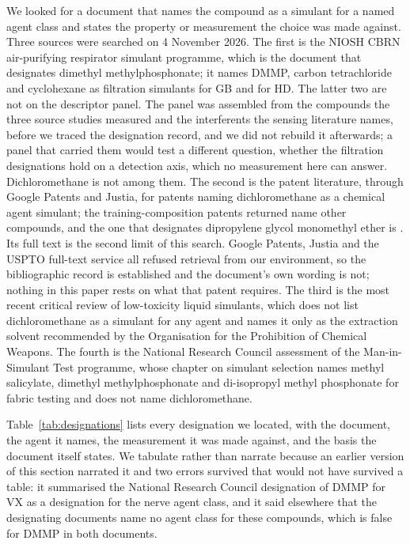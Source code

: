 \documentclass[journal=jacsat,manuscript=suppinfo,margin=1in]{achemso}
\begin{document}
We looked for a document that names the compound as a simulant for a named
agent class and states the property or measurement the choice was made
against. Three sources were searched on 4 November 2026. The first is the
NIOSH CBRN air-purifying respirator simulant programme, which is the
document that designates dimethyl methylphosphonate\cite{niosh2002simulant};
it names DMMP, carbon tetrachloride and cyclohexane as filtration simulants
for GB and for HD. The latter two are not on the descriptor panel. The panel
was assembled from the compounds the three source studies measured and the
interferents the sensing literature names, before we traced the designation
record, and we did not rebuild it afterwards; a panel that carried them would
test a different question, whether the filtration designations hold on a
detection axis, which no measurement here can answer. Dichloromethane is not
among them. The second is the patent literature, through Google Patents and
Justia, for patents naming dichloromethane as a chemical agent simulant;
the training-composition patents returned name other compounds, and the one
that designates dipropylene glycol monomethyl ether is
\cite{seitzinger2006simulant}. Its full text is the second limit of this
search. Google Patents, Justia and the USPTO full-text service all refused
retrieval from our environment, so the bibliographic record is established and
the document's own wording is not; nothing in this paper rests on what that
patent requires. The third is the most recent critical review
of low-toxicity liquid simulants\cite{webb2025}, which does not list
dichloromethane as a simulant for any agent and names it only as the
extraction solvent recommended by the Organisation for the Prohibition of
Chemical Weapons. The fourth is the National Research Council assessment of
the Man-in-Simulant Test programme\cite{nrc1997mist}, whose chapter on
simulant selection names methyl salicylate, dimethyl methylphosphonate and
di-isopropyl methyl phosphonate for fabric testing and does not name
dichloromethane.

Table~\ref{tab:designations} lists every designation we located, with the
document, the agent it names, the measurement it was made against, and the
basis the document itself states. We tabulate rather than narrate because an
earlier version of this section narrated it and two errors survived that
would not have survived a table: it summarised the National Research Council
designation of DMMP for VX as a designation for the nerve agent class, and it
said elsewhere that the designating documents name no agent class for these
compounds, which is false for DMMP in both documents.
\end{document}
